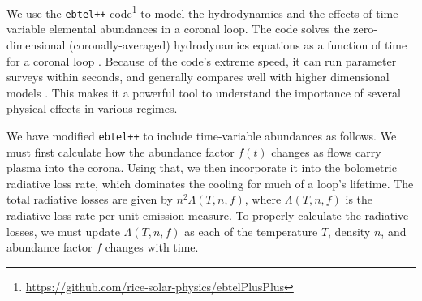 \documentclass[twocolumn]{aastex631}
\begin{document}
We use the \texttt{ebtel++} code\footnote{\url{https://github.com/rice-solar-physics/ebtelPlusPlus}} \citep{barnes2016} to model the hydrodynamics and the effects of time-variable elemental abundances in a coronal loop.  The code solves the zero-dimensional (coronally-averaged) hydrodynamics equations as a function of time for a coronal loop \citep{klimchuk2008,cargill2012a,cargill2012b}.  Because of the code's extreme speed, it can run parameter surveys within seconds, and generally compares well with higher dimensional models \citep{barnes2016}.  This makes it a powerful tool to understand the importance of several physical effects in various regimes.  

We have modified \texttt{ebtel++} to include time-variable abundances as follows.  We must first calculate how the abundance factor $f(t)$ changes as flows carry plasma into the corona.  Using that, we then incorporate it into the bolometric radiative loss rate, which dominates the cooling for much of a loop's lifetime.  The total radiative losses are given by $n^{2} \Lambda(T, n, f)$, where $\Lambda(T, n, f)$ is the radiative loss rate per unit emission measure.  To properly calculate the radiative losses, we must update $\Lambda(T, n, f)$ as each of the temperature $T$, density $n$, and abundance factor $f$ changes with time.
\end{document}
